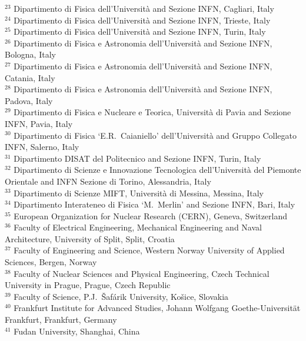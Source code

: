 \begin{flushleft}
$^{23}$ Dipartimento di Fisica dell'Universit\`{a} and Sezione INFN, Cagliari, Italy\\
$^{24}$ Dipartimento di Fisica dell'Universit\`{a} and Sezione INFN, Trieste, Italy\\
$^{25}$ Dipartimento di Fisica dell'Universit\`{a} and Sezione INFN, Turin, Italy\\
$^{26}$ Dipartimento di Fisica e Astronomia dell'Universit\`{a} and Sezione INFN, Bologna, Italy\\
$^{27}$ Dipartimento di Fisica e Astronomia dell'Universit\`{a} and Sezione INFN, Catania, Italy\\
$^{28}$ Dipartimento di Fisica e Astronomia dell'Universit\`{a} and Sezione INFN, Padova, Italy\\
$^{29}$ Dipartimento di Fisica e Nucleare e Teorica, Universit\`{a} di Pavia  and Sezione INFN, Pavia, Italy\\
$^{30}$ Dipartimento di Fisica `E.R.~Caianiello' dell'Universit\`{a} and Gruppo Collegato INFN, Salerno, Italy\\
$^{31}$ Dipartimento DISAT del Politecnico and Sezione INFN, Turin, Italy\\
$^{32}$ Dipartimento di Scienze e Innovazione Tecnologica dell'Universit\`{a} del Piemonte Orientale and INFN Sezione di Torino, Alessandria, Italy\\
$^{33}$ Dipartimento di Scienze MIFT, Universit\`{a} di Messina, Messina, Italy\\
$^{34}$ Dipartimento Interateneo di Fisica `M.~Merlin' and Sezione INFN, Bari, Italy\\
$^{35}$ European Organization for Nuclear Research (CERN), Geneva, Switzerland\\
$^{36}$ Faculty of Electrical Engineering, Mechanical Engineering and Naval Architecture, University of Split, Split, Croatia\\
$^{37}$ Faculty of Engineering and Science, Western Norway University of Applied Sciences, Bergen, Norway\\
$^{38}$ Faculty of Nuclear Sciences and Physical Engineering, Czech Technical University in Prague, Prague, Czech Republic\\
$^{39}$ Faculty of Science, P.J.~\v{S}af\'{a}rik University, Ko\v{s}ice, Slovakia\\
$^{40}$ Frankfurt Institute for Advanced Studies, Johann Wolfgang Goethe-Universit\"{a}t Frankfurt, Frankfurt, Germany\\
$^{41}$ Fudan University, Shanghai, China\\

\end{flushleft}
